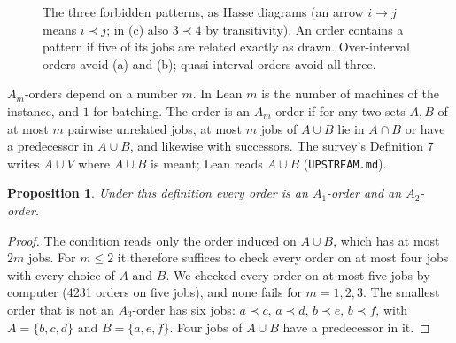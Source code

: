\documentclass[11pt]{article}
\newcommand{\lean}[1]{\texttt{#1}}
\newtheorem{proposition}{Proposition}
\theoremstyle{definition}
\begin{document}
\begin{figure}[ht]
\centering
{}
\caption{The three forbidden patterns, as Hasse diagrams (an arrow
$i\to j$ means $i\prec j$; in (c) also $3\prec 4$ by transitivity). An order
contains a pattern if five of its jobs are related exactly as drawn. Over-interval
orders avoid (a) and (b); quasi-interval orders avoid all three.}
\label{fig:patterns}
\end{figure}

$A_m$-orders depend on a number $m$. In Lean $m$ is the number of machines of
the instance, and $1$ for batching. The order is an $A_m$-order if for any two
sets $A,B$ of at most $m$ pairwise unrelated jobs, at most $m$ jobs of
$A\cup B$ lie in $A\cap B$ or have a predecessor in $A\cup B$, and likewise
with successors. The survey's Definition 7 writes $A\cup V$ where $A\cup B$ is
meant; Lean reads $A\cup B$ (\lean{UPSTREAM.md}).

\begin{proposition}
Under this definition every order is an $A_1$-order and an $A_2$-order.
\end{proposition}

\begin{proof}
The condition reads only the order induced on $A\cup B$, which has at most
$2m$ jobs. For $m\le 2$ it therefore suffices to check every order on at most
four jobs with every choice of $A$ and $B$. We checked every order on at most
five jobs by computer (4231 orders on five jobs), and none fails for
$m=1,2,3$. The smallest order that is not an $A_3$-order has six jobs:
$a\prec c$, $a\prec d$, $b\prec e$, $b\prec f$, with $A=\{b,c,d\}$ and
$B=\{a,e,f\}$. Four jobs of $A\cup B$ have a predecessor in it.
\end{proof}
\end{document}
